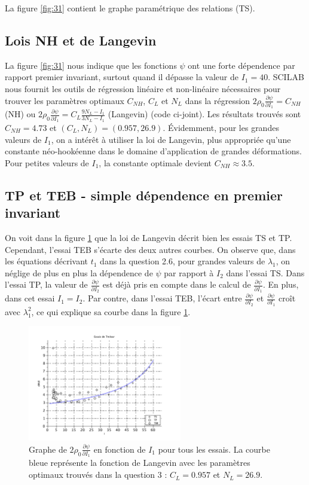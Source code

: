 \documentclass[a4paper,11pt]{article}
\begin{document}
La figure \ref{fig:31} contient le graphe paramétrique des relations (TS).

\subsection{Lois NH et de Langevin}
La figure \ref{fig:31} nous indique que les fonctions $\psi$ ont une forte dépendence par rapport premier invariant, surtout quand il dépasse la valeur de $I_1 = 40$. SCILAB nous fournit les outils de régression linéaire et non-linéaire nécessaires pour trouver les paramètres optimaux $C_{NH}$, $C_L$ et $N_L$ dans la régression $2 \rho_0 \frac{\partial\psi}{\partial I_1} = C_{NH}$ (NH) ou $2 \rho_0 \frac{\partial\psi}{\partial I_1} = C_L \frac{9N_L-I_1}{3N_L-I_1}$ (Langevin) (code ci-joint). Les résultats trouvés sont $C_{NH} = 4.73$ et $(C_L, N_L) = (0.957, 26.9)$. Évidemment, pour les grandes valeurs de $I_1$, on a intérêt à utiliser la loi de Langevin, plus appropriée qu'une constante néo-hookéenne dans le domaine d'application de grandes déformations. Pour petites valeurs de $I_1$, la constante optimale devient $C_{NH} \approx 3.5$.

\subsection{TP et TEB - simple dépendence en premier invariant}

On voit dans la figure \ref{fig:32} que la loi de Langevin décrit bien les essais TS et TP. Cependant, l'essai TEB s'écarte des deux autres courbes. On observe que, dans les équations décrivant $t_1$ dans la question 2.6, pour grandes valeurs de $\lambda_1$, on néglige de plus en plus la dépendence de $\psi$ par rapport à $I_2$ dans l'essai TS. Dans l'essai TP, la valeur de $\frac{\partial\psi}{\partial I_2}$ est déjà pris en compte dans le calcul de $\frac{\partial\psi}{\partial I_1}$. En plus, dans cet essai $I_1 = I_2$. Par contre, dans l'essai TEB, l'écart entre $\frac{\partial\psi}{\partial I_2}$ et $\frac{\partial\psi}{\partial I_1}$ croît avec $\lambda_1^2$, ce qui explique sa courbe dans la figure \ref{fig:32}.

\begin{figure}[!ht]
\centering
\includegraphics[width=0.6\textwidth]{scilab_prof/q32.pdf}
\caption{Graphe de $2 \rho_0 \frac{\partial\psi}{\partial I_1}$ en fonction de $I_1$ pour tous les essais. La courbe bleue représente la fonction de Langevin avec les paramètres optimaux trouvés dans la question 3 : $C_L = 0.957$ et $N_L=26.9$.}
\label{fig:32}
\end{figure}
\end{document}
